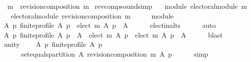 \begin{isabellebody}
\ \ {\isachardoublequoteopen}m{\isasymdown}\ {\isacharequal}{\kern0pt}{\isacharequal}{\kern0pt}\ revision{\isacharunderscore}{\kern0pt}composition\ m{\isachardoublequoteclose}%
\isadelimdocument
%
\endisadelimdocument
%
\isatagdocument
%
\isamarkuptrue%
%
\endisatagdocument
{\isafolddocument}%
%
\isadelimdocument
%
\endisadelimdocument
{}\isamarkupfalse%
\ rev{\isacharunderscore}{\kern0pt}comp{\isacharunderscore}{\kern0pt}sound{\isacharbrackleft}{\kern0pt}simp{\isacharbrackright}{\kern0pt}{\isacharcolon}{\kern0pt}\isanewline
\ \ \ module{\isacharcolon}{\kern0pt}\ {\isachardoublequoteopen}electoral{\isacharunderscore}{\kern0pt}module\ m{\isachardoublequoteclose}\isanewline
\ \ \ {\isachardoublequoteopen}electoral{\isacharunderscore}{\kern0pt}module\ {\isacharparenleft}{\kern0pt}revision{\isacharunderscore}{\kern0pt}composition\ m{\isacharparenright}{\kern0pt}{\isachardoublequoteclose}\isanewline
%
\isadelimproof
%
\endisadelimproof
%
\isatagproof
{}\isamarkupfalse%
\ {\isacharminus}{\kern0pt}\isanewline
\ \ \isamarkupfalse%
\ module\ \isamarkupfalse%
\ {\isachardoublequoteopen}{\isasymforall}A\ p{\isachardot}{\kern0pt}\ finite{\isacharunderscore}{\kern0pt}profile\ A\ p\ {\isasymlongrightarrow}\ elect\ m\ A\ p\ {\isasymsubseteq}\ A{\isachardoublequoteclose}\isanewline
\ \ \ \ \isamarkupfalse%
\ elect{\isacharunderscore}{\kern0pt}in{\isacharunderscore}{\kern0pt}alts\isanewline
\ \ \ \ \isamarkupfalse%
\ auto\isanewline
\ \ \isamarkupfalse%
\ {\isachardoublequoteopen}{\isasymforall}A\ p{\isachardot}{\kern0pt}\ finite{\isacharunderscore}{\kern0pt}profile\ A\ p\ {\isasymlongrightarrow}\ {\isacharparenleft}{\kern0pt}A\ {\isacharminus}{\kern0pt}\ elect\ m\ A\ p{\isacharparenright}{\kern0pt}\ {\isasymunion}\ elect\ m\ A\ p\ {\isacharequal}{\kern0pt}\ A{\isachardoublequoteclose}\isanewline
\ \ \ \ \isamarkupfalse%
\ blast\isanewline
\ \ \isamarkupfalse%
\ unity{\isacharcolon}{\kern0pt}\isanewline
\ \ \ \ {\isachardoublequoteopen}{\isasymforall}A\ p{\isachardot}{\kern0pt}\ finite{\isacharunderscore}{\kern0pt}profile\ A\ p\ {\isasymlongrightarrow}\isanewline
\ \ \ \ \ \ set{\isacharunderscore}{\kern0pt}equals{\isacharunderscore}{\kern0pt}partition\ A\ {\isacharparenleft}{\kern0pt}revision{\isacharunderscore}{\kern0pt}composition\ m\ A\ p{\isacharparenright}{\kern0pt}{\isachardoublequoteclose}\isanewline
\ \ \ \ \isamarkupfalse%
\ simp\isanewline

\end{isabellebody}
